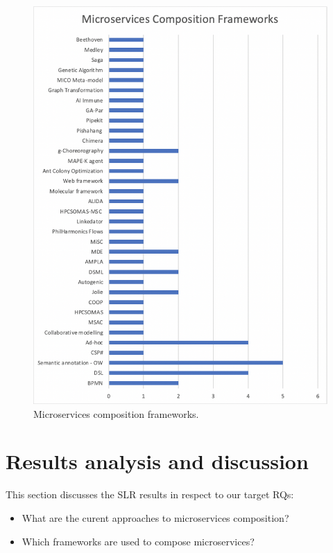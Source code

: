 \documentclass{article}
\begin{document}
\begin{multicols}{2}
\begin{figure}[htb!]
 \centerline{\includegraphics[scale=0.60]{mscompframw.png}}
  \caption{Microservices composition frameworks.}
  \label{fig}
\end{figure}

\section{Results analysis and discussion}

This section discusses the SLR results in respect to our target RQs:

\begin{itemize}
\item{What are the curent approaches to microservices composition?}
\item{Which frameworks are used to compose microservices?}
\end{itemize}


\end{multicols}
\end{document}
